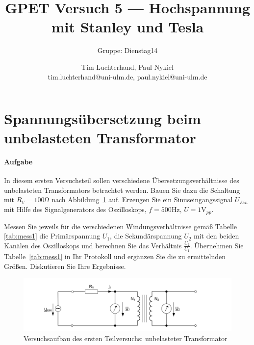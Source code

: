 \documentclass[10pt]{scrreprt}
\author{Tim Luchterhand, Paul Nykiel \protect\\ tim.luchterhand@uni-ulm.de, paul.nykiel@uni-ulm.de}
\title{GPET Versuch 5 --- Hochspannung mit Stanley und Tesla}
\subtitle{Gruppe: Dienstag14}
\begin{document}
        \maketitle
        \section{Spannungsübersetzung beim unbelasteten Transformator}
        \paragraph{Aufgabe}
        In diesem ersten Versuchsteil sollen verschiedene Übersetzungsverhältnisse des
        unbelasteten Transformators betrachtet werden. Bauen Sie dazu die Schaltung mit $R_V = 100\si{\ohm}$
        nach Abbildung~\ref{fig:abb8} auf. Erzeugen Sie ein Sinuseingangssignal $U_{Ein}$ mit Hilfe des Signalgenerators
        des Oszilloskops, $f = 500\si{\hertz}$, $U = 1\si{\volt}_{pp}$.

        \vspace{0.5cm}

        Messen Sie jeweils für die verschiedenen Windungsverhältnisse gemäß Tabelle \ref{tab:mess1} die
        Primärspannung $U_1$, die Sekundärspannung $U_2$ mit den beiden Kanälen des Oszilloskops und
        berechnen Sie das Verhältnis $\frac{U_2}{U_1}$. Übernehmen Sie Tabelle~\ref{tab:mess1} in Ihr Protokoll und ergänzen
        Sie die zu ermittelnden Größen. Diskutieren Sie Ihre Ergebnisse.

        \begin{center}
            \begin{figure}[H]
                \includegraphics[width=\textwidth]{aufgabenBilder/abbildung8.png}
                \caption{Versuchsaufbau des ersten Teilversuchs: unbelasteter Transformator}
                \label{fig:abb8}
            \end{figure}
        \end{center}
\end{document}
